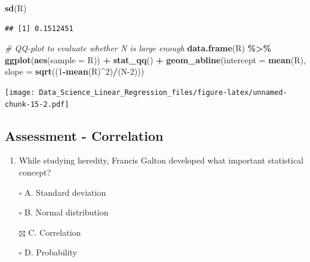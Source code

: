 \documentclass[
]{article}
\newenvironment{Shaded}{\begin{snugshade}}{\end{snugshade}}
\newcommand{\CommentTok}[1]{\textcolor[rgb]{0.56,0.35,0.01}{\textit{#1}}}
\newcommand{\DataTypeTok}[1]{\textcolor[rgb]{0.13,0.29,0.53}{#1}}
\newcommand{\DecValTok}[1]{\textcolor[rgb]{0.00,0.00,0.81}{#1}}
\newcommand{\KeywordTok}[1]{\textcolor[rgb]{0.13,0.29,0.53}{\textbf{#1}}}
\newcommand{\NormalTok}[1]{#1}
\newcommand{\OperatorTok}[1]{\textcolor[rgb]{0.81,0.36,0.00}{\textbf{#1}}}
\newcommand{\StringTok}[1]{\textcolor[rgb]{0.31,0.60,0.02}{#1}}
\providecommand{\tightlist}{%
  \setlength{\itemsep}{0pt}\setlength{\parskip}{0pt}}
\begin{document}
\begin{Shaded}
\begin{Highlighting}[]
\KeywordTok{sd}\NormalTok{(R)}
\end{Highlighting}
\end{Shaded}

\begin{verbatim}
## [1] 0.1512451
\end{verbatim}

\begin{Shaded}
\begin{Highlighting}[]
\CommentTok{\# QQ{-}plot to evaluate whether N is large enough}
\KeywordTok{data.frame}\NormalTok{(R) }\OperatorTok{\%\textgreater{}\%}
\StringTok{    }\KeywordTok{ggplot}\NormalTok{(}\KeywordTok{aes}\NormalTok{(}\DataTypeTok{sample =}\NormalTok{ R)) }\OperatorTok{+}
\StringTok{    }\KeywordTok{stat\_qq}\NormalTok{() }\OperatorTok{+}
\StringTok{    }\KeywordTok{geom\_abline}\NormalTok{(}\DataTypeTok{intercept =} \KeywordTok{mean}\NormalTok{(R), }\DataTypeTok{slope =} \KeywordTok{sqrt}\NormalTok{((}\DecValTok{1}\OperatorTok{{-}}\KeywordTok{mean}\NormalTok{(R)}\OperatorTok{\^{}}\DecValTok{2}\NormalTok{)}\OperatorTok{/}\NormalTok{(N}\DecValTok{{-}2}\NormalTok{)))}
\end{Highlighting}
\end{Shaded}

\texttt{[image: Data\_Science\_Linear\_Regression\_files/figure-latex/unnamed-chunk-15-2.pdf]}

\hypertarget{assessment---correlation}{%
\subsection{Assessment - Correlation}\label{assessment---correlation}}

\begin{enumerate}
\def\labelenumi{\arabic{enumi}.}
\tightlist
\item
  While studying heredity, Francis Galton developed what important
  statistical concept?
\end{enumerate}

\begin{itemize}
\tightlist
\item[$\square$]
  A. Standard deviation
\item[$\square$]
  B. Normal distribution
\item[$\boxtimes$]
  C. Correlation
\item[$\square$]
  D. Probability
\end{itemize}
\end{document}
